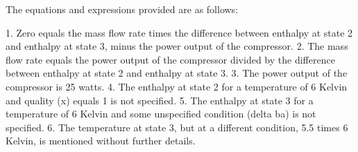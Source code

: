 The equations and expressions provided are as follows:

1. Zero equals the mass flow rate times the difference between enthalpy at state 2 and enthalpy at state 3, minus the power output of the compressor.
2. The mass flow rate equals the power output of the compressor divided by the difference between enthalpy at state 2 and enthalpy at state 3.
3. The power output of the compressor is 25 watts.
4. The enthalpy at state 2 for a temperature of 6 Kelvin and quality (x) equals 1 is not specified.
5. The enthalpy at state 3 for a temperature of 6 Kelvin and some unspecified condition (delta ba) is not specified.
6. The temperature at state 3, but at a different condition, 5.5 times 6 Kelvin, is mentioned without further details.